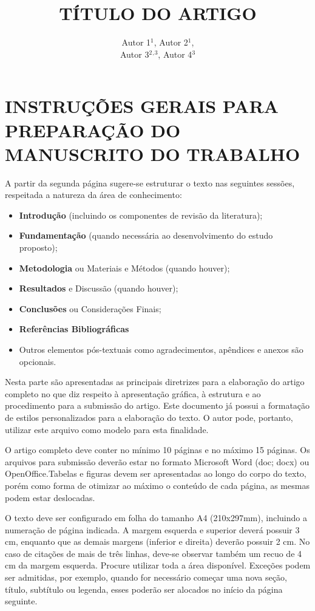 \documentclass[10pt,brazil,english]{article}
\title{TÍTULO DO ARTIGO}
\author{Autor 1$^{1}$, Autor 2$^{1}$, \\ Autor 3$^{2}$$^{,}$$^{3}$, Autor 4$^{3}$ }
\begin{document}
\pagestyle{fancy} %

\maketitle
\newpage


\section{\uppercase{Instruções gerais para preparação do manuscrito do trabalho}}

A partir da segunda página sugere-se estruturar o texto nas seguintes sessões, respeitada a natureza da área de conhecimento:

\begin{itemize}
\item \textbf{Introdução} (incluindo os componentes de revisão da literatura);
\item	\textbf{Fundamentação} (quando necessária ao desenvolvimento do estudo proposto);
\item	\textbf{Metodologia} ou Materiais e Métodos (quando houver);
\item	\textbf{Resultados} e Discussão (quando houver);
\item	\textbf{Conclusões} ou Considerações Finais;
\item	\textbf{Referências Bibliográficas}
\item	Outros elementos pós-textuais como agradecimentos, apêndices e anexos são opcionais.

\end{itemize}

Nesta parte são apresentadas as principais diretrizes para a elaboração do artigo completo no que diz respeito à apresentação gráfica, à estrutura e ao procedimento para a submissão do artigo. Este documento já possui a formatação de estilos personalizados para a elaboração do texto. O autor pode, portanto, utilizar este arquivo como modelo para esta finalidade.

O artigo completo deve conter no mínimo 10 páginas e no máximo 15 páginas. Os arquivos para submissão deverão estar no formato Microsoft Word (doc; docx) ou OpenOffice.Tabelas e figuras devem ser apresentadas ao longo do corpo do texto, porém como forma de otimizar ao máximo o conteúdo de cada página, as mesmas podem estar deslocadas.

O texto deve ser configurado em folha do tamanho A4 (210x297mm), incluindo a numeração de página indicada. A margem esquerda e superior deverá possuir 3 cm, enquanto que as demais margens (inferior e direita) deverão possuir 2 cm. No caso de citações de mais de três linhas, deve-se observar também um recuo de 4 cm da margem esquerda. Procure utilizar toda a área disponível. Exceções podem ser admitidas, por exemplo, quando for necessário começar uma nova seção, título, subtítulo ou legenda, esses poderão ser alocados no início da página seguinte.
\end{document}
